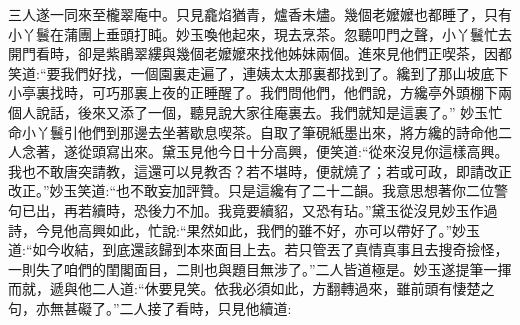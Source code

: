 \begin{parag}
    三人遂一同來至櫳翠庵中。只見龕焰猶青，爐香未燼。幾個老嬤嬤也都睡了，只有小丫鬟在蒲團上垂頭打盹。妙玉喚他起來，現去烹茶。忽聽叩門之聲，小丫鬟忙去開門看時，卻是紫鵑翠縷與幾個老嬤嬤來找他姊妹兩個。進來見他們正喫茶，因都笑道:“要我們好找，一個園裏走遍了，連姨太太那裏都找到了。纔到了那山坡底下小亭裏找時，可巧那裏上夜的正睡醒了。我們問他們，他們說，方纔亭外頭棚下兩個人說話，後來又添了一個，聽見說大家往庵裏去。我們就知是這裏了。” 妙玉忙命小丫鬟引他們到那邊去坐著歇息喫茶。自取了筆硯紙墨出來，將方纔的詩命他二人念著，遂從頭寫出來。黛玉見他今日十分高興，便笑道:“從來沒見你這樣高興。我也不敢唐突請教，這還可以見教否？若不堪時，便就燒了；若或可政，即請改正改正。”妙玉笑道:“也不敢妄加評贊。只是這纔有了二十二韻。我意思想著你二位警句已出，再若續時，恐後力不加。我竟要續貂，又恐有玷。”黛玉從沒見妙玉作過詩，今見他高興如此，忙說:“果然如此，我們的雖不好，亦可以帶好了。”妙玉道:“如今收結，到底還該歸到本來面目上去。若只管丟了真情真事且去搜奇撿怪，一則失了咱們的閨閣面目，二則也與題目無涉了。”二人皆道極是。妙玉遂提筆一揮而就，遞與他二人道:“休要見笑。依我必須如此，方翻轉過來，雖前頭有悽楚之句，亦無甚礙了。”二人接了看時，只見他續道:
\end{parag}



